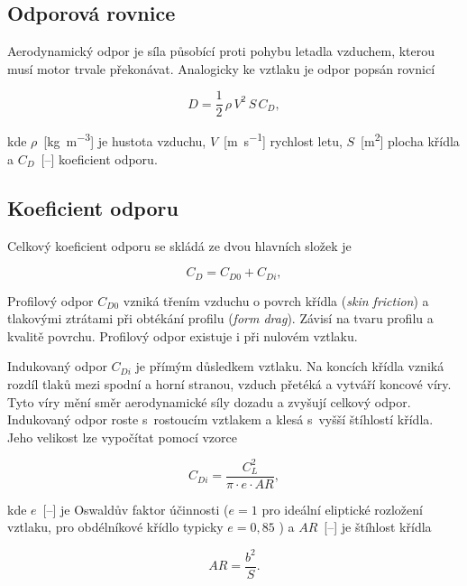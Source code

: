 \documentclass[12pt, a4paper, oneside]{report}
\begin{document}
\subsection{Odporová rovnice}
Aerodynamický odpor je síla působící proti pohybu letadla vzduchem,
kterou musí motor trvale překonávat. Analogicky ke vztlaku je odpor
popsán rovnicí

\begin{equation}
    D = \frac{1}{2}\,\rho\,V^{2}\,S\,C_D,
    \label{eq:drag}
\end{equation}

kde $\rho$~[\si{\kilogram\per\cubic\metre}] je hustota vzduchu,
$V$~[\si{\metre\per\second}] rychlost letu, $S$~[\si{\square\metre}]
plocha křídla a $C_D$~[--] koeficient odporu.

\subsection{Koeficient odporu}

Celkový koeficient odporu se skládá ze dvou hlavních složek je 

\begin{equation}
    C_D = C_{D0} + C_{Di},
     \label{eq:CD}
\end{equation}

Profilový odpor $C_{D0}$ vzniká třením vzduchu o povrch
křídla (\textit{skin friction}) a tlakovými ztrátami při obtékání
profilu (\textit{form drag}). Závisí na tvaru profilu a kvalitě
povrchu. Profilový odpor existuje i při nulovém vztlaku.

Indukovaný odpor $C_{Di}$ je přímým důsledkem
vztlaku. Na koncích křídla vzniká rozdíl tlaků mezi spodní a horní
stranou, vzduch přetéká a vytváří koncové víry. Tyto víry mění směr aerodynamické síly
dozadu a zvyšují celkový odpor. Indukovaný odpor roste s~rostoucím
vztlakem a klesá s~vyšší štíhlostí křídla. Jeho velikost lze vypočítat pomocí vzorce

\begin{equation}
    C_{Di} = \frac{C_L^2}{\pi \cdot e \cdot AR},
    \label{eq:Cdi}
\end{equation}

kde $e$~[--] je Oswaldův faktor účinnosti ($e = 1$ pro ideální
eliptické rozložení vztlaku, pro obdélníkové křídlo typicky
$e = 0{,}85$ \cite{anderson}) a $AR$~[--] je štíhlost křídla

\begin{equation}
    AR = \frac{b^2}{S}.
    \label{eq:AR}
\end{equation}
\end{document}
